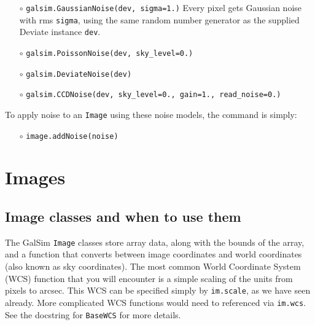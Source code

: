 \documentclass[preprint,11pt]{../../devel/modules/aastex}
\begin{document}
\begin{itemize}
\item[$\circ$] \texttt{galsim.GaussianNoise(dev, sigma=1.)}  \newline
  {Every pixel gets Gaussian noise with rms \texttt{sigma}, using the
    same random number generator as the supplied Deviate instance
    \texttt{dev}.}

\item[$\circ$] \texttt{galsim.PoissonNoise(dev, sky\_level=0.)}

\item[$\circ$] \texttt{galsim.DeviateNoise(dev)} 

\item[$\circ$] \texttt{galsim.CCDNoise(dev, sky\_level=0., gain=1.,
    read\_noise=0.)}  

\end{itemize}

To apply noise to an \texttt{Image} using these noise models,
the command is simply:

\begin{itemize}

\item[$\circ$] \texttt{image.addNoise(noise)} 

\end{itemize}

\section{Images}\label{sect:image}

\subsection{Image classes and when to use them}\label{sect:imageclasses}
The GalSim \texttt{Image} classes store array data, along with the bounds
of the array, and a
function that converts between image coordinates and world coordinates
(also known as sky coordinates).  The most common World Coordinate System
(WCS) function that you will encounter is a simple scaling of the units
from pixels to arcsec.  This WCS can be specified simply by \texttt{im.scale},
as we have seen already.  More complicated WCS functions would need to
referenced via \texttt{im.wcs}.  See the docstring for \texttt{BaseWCS}
for more details.
\end{document}
